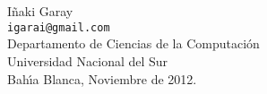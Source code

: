 \chapter*{ }



\null
\vfill

\begin{flushright}
I\~{n}aki Garay \\
{\small \tt igarai@gmail.com} \\
{\sc Departamento de Ciencias de la Computaci\'on \\
Universidad Nacional del Sur }\\
Bah\'{\i}a Blanca, Noviembre de 2012. \\
\end{flushright}
